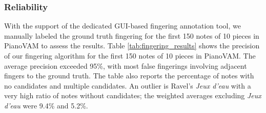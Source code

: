 \documentclass{article}
\begin{document}
\subsubsection{Reliability}
With the support of the dedicated GUI-based fingering annotation tool, we manually labeled the ground truth fingering for the first 150 notes of 10 pieces in PianoVAM to assess the results. Table \ref{tab:fingering_results} shows the precision of our fingering algorithm for the first 150 notes of 10 pieces in PianoVAM. The average precision exceeded 95\%, with most false fingerings involving adjacent fingers to the ground truth. The table also reports the percentage of notes with no candidates and multiple candidates. %
An outlier is Ravel's \textit{Jeux d'eau} with a very high ratio of notes without candidates; the weighted averages excluding \textit{Jeux d'eau} were 9.4\% and 5.2\%.
\end{document}

